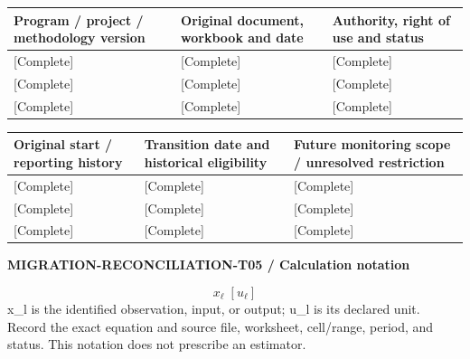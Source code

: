 {\sffamily\fontsize{8.3}{10.3}\selectfont\begin{longtable}{@{}P{54.83mm} P{54.83mm} P{54.83mm}@{}}
\toprule
\textbf{Program / project / methodology version} & \textbf{Original document, workbook and date} & \textbf{Authority, right of use and status}\\\midrule\endhead
\rule{0pt}{8mm}[Complete] & [Complete] & [Complete]\\\hline
\rule{0pt}{8mm}[Complete] & [Complete] & [Complete]\\\hline
\rule{0pt}{8mm}[Complete] & [Complete] & [Complete]\\\hline
\end{longtable}}
{\sffamily\fontsize{8.3}{10.3}\selectfont\begin{longtable}{@{}P{54.83mm} P{54.83mm} P{54.83mm}@{}}
\toprule
\textbf{Original start / reporting history} & \textbf{Transition date and historical eligibility} & \textbf{Future monitoring scope / unresolved restriction}\\\midrule\endhead
\rule{0pt}{8mm}[Complete] & [Complete] & [Complete]\\\hline
\rule{0pt}{8mm}[Complete] & [Complete] & [Complete]\\\hline
\rule{0pt}{8mm}[Complete] & [Complete] & [Complete]\\\hline
\end{longtable}}
\par\begingroup\sffamily\fontsize{8}{10}\selectfont\color{NEBGreen}\setlength{\parskip}{2pt}\setlength{\abovedisplayskip}{4pt}\setlength{\belowdisplayskip}{4pt}\setlength{\abovedisplayshortskip}{2pt}\setlength{\belowdisplayshortskip}{3pt}
\textbf{MIGRATION-RECONCILIATION-T05 / Calculation notation}\par
{\fontsize{9}{11}\selectfont\[ x_{\ell}\;[u_{\ell}] \]}
x\_l is the identified observation, input, or output; u\_l is its declared unit. Record the exact equation and source file, worksheet, cell/range, period, and status. This notation does not prescribe an estimator.\par
